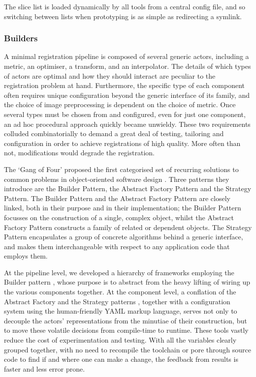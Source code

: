 			The slice list is loaded dynamically by all tools from a central config file, and so switching between lists when prototyping is as simple as redirecting a symlink.
    
    \subsubsection{Builders} %
    \label{ssub:builders}
      A minimal registration pipeline is composed of several generic actors, including a metric, an optimiser, a transform, and an interpolator. The details of which types of actors are optimal and how they should interact are peculiar to the registration problem at hand. Furthermore, the specific type of each component often requires unique configuration beyond the generic interface of its family, and the choice of image preprocessing is dependent on the choice of metric. Once several types must be chosen from and configured, even for just one component, an ad hoc procedural approach quickly became unwieldy. These two requirements colluded combinatorially to demand a great deal of testing, tailoring and configuration in order to achieve registrations of high quality. More often than not, modifications would degrade the registration.
			
      The `Gang of Four' proposed the first categorised set of recurring solutions to common problems in object-oriented software design \cite{Gamma1995}. Three patterns they introduce are the Builder Pattern, the Abstract Factory Pattern and the Strategy Pattern. The Builder Pattern and the Abstract Factory Pattern are closely linked, both in their purpose and in their implementation; the Builder Pattern focusses on the construction of a single, complex object, whilst the Abstract Factory Pattern constructs a family of related or dependent objects. The Strategy Pattern encapsulates a group of concrete algorithms behind a generic interface, and makes them interchangeable with respect to any application code that employs them.
      
      At the pipeline level, we developed a hierarchy of frameworks employing the Builder pattern \cite{Gamma1995}, whose purpose is to abstract from the heavy lifting of wiring up the various components together. At the component level, a conflation of the Abstract Factory and the Strategy patterns \cite{Gamma1995}, together with a configuration system using the human-friendly YAML markup language, serves not only to decouple the actors' representations from the minutiae of their construction, but to move these volatile decisions from compile-time to runtime. These tools vastly reduce the cost of experimentation and testing. With all the variables clearly grouped together, with no need to recompile the toolchain or pore through source code to find if and where one can make a change, the feedback from results is faster and less error prone.
      
